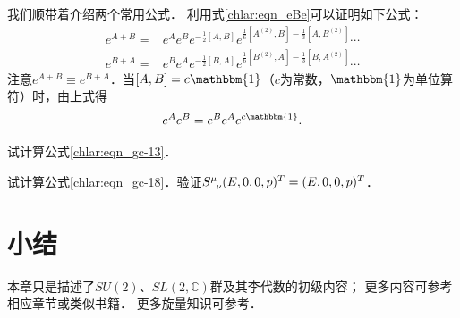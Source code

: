 我们顺带着介绍两个常用公式．
利用式\eqref{chlar:eqn_eBe}可以证明\cite[\S 2-2]{ka2001}如下公式：
\begin{subequations}\label{chlar:eqn_eA+B}
\begin{align}
	e^{A+B} =& e^A e^B e^{-\frac{1}{2}[A,B]} e^{\frac{1}{6}[A^{(2)},B]-\frac{1}{3}[A,B^{(2)}]} \cdots \\
	e^{B+A} =& e^B e^A e^{-\frac{1}{2}[B,A]} e^{\frac{1}{6}[B^{(2)},A]-\frac{1}{3}[B,A^{(2)}]} \cdots 
\end{align}
\end{subequations}
注意$e^{A+B} \equiv e^{B+A}$．当$[A,B]=c \mathbbm{1}$（$c$为常数，$\mathbbm{1}$为单位算符）时，由上式得
\begin{equation}\label{chlar:eqn_eA+Bh}
	e^A e^B = e^B e^A e^{c \mathbbm{1}} .
\end{equation}


\begin{exercise}
	试计算公式\eqref{chlar:eqn_gc-13}．
\end{exercise}

\begin{exercise}
	试计算公式\eqref{chlar:eqn_gc-18}．验证$S^\mu_{\hphantom{\mu}\nu} (E,0,0,p)^T=(E,0,0,p)^T$．
\end{exercise}







\section*{小结}


本章只是描述了$SU(2)$、$SL(2,\mathbb{C})$群及其李代数的初级内容；
更多内容可参考\parencite{carmeli-rl1976,taorb-2011-gt,tung-1985}相应章节或类似书籍．  
更多旋量知识可参考\parencite{penrose-Rindler1984}．


\endinput













